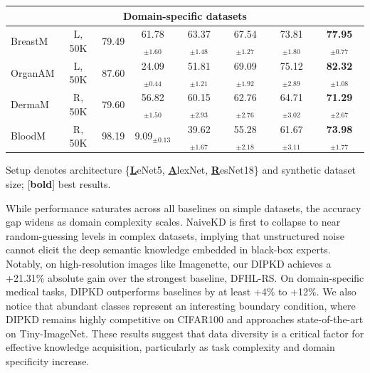 \begin{table}[ht]
\begin{threeparttable}
\begin{tabular}{l c c c c c c c}
      \multicolumn{8}{c}{\textbf{Domain-specific datasets}} \\
      \midrule
      BreastM  & L, 50K  & 79.49 & 61.78$_{\pm 1.60}$           & 63.37$_{\pm 1.48}$           & 67.54$_{\pm 1.27}$ & 73.81$_{\pm 1.80}$          & \textbf{77.95}$_{\pm 0.77}$ \\
      OrganAM  & L, 50K  & 87.60 & 24.09$_{\pm 0.44}$           & 51.81$_{\pm 1.21}$           & 69.09$_{\pm 1.92}$ & 75.12$_{\pm 2.89}$          & \textbf{82.32}$_{\pm 1.08}$ \\
      DermaM   & R, 50K  & 79.60 & 56.82$_{\pm 1.50}$           & 60.15$_{\pm 2.93}$           & 62.76$_{\pm 2.76}$ & 64.71$_{\pm 3.02}$          & \textbf{71.29}$_{\pm 2.67}$ \\
      BloodM   & R, 50K  & 98.19 & \phantom{0}9.09$_{\pm 0.13}$ & 39.62$_{\pm 1.67}$           & 55.28$_{\pm 2.18}$ & 61.67$_{\pm 3.11}$          & \textbf{73.98}$_{\pm 1.77}$ \\
      \bottomrule
    \end{tabular}
    \begin{tablenotes}[flushleft] \footnotesize
    \item {Setup denotes architecture \{\textbf{\underline{L}}eNet5, \textbf{\underline{A}}lexNet, \textbf{\underline{R}}esNet18\} and synthetic dataset size; [\textbf{bold}] best results.}
    \end{tablenotes}
  \end{threeparttable}
\end{table}

\begin{foldable}
  While performance saturates across all baselines on simple datasets, the accuracy gap widens as domain complexity scales.
  NaiveKD is first to collapse to near random-guessing levels in complex datasets, implying that unstructured noise cannot elicit the deep semantic knowledge embedded in black-box experts.
  Notably, on high-resolution images like Imagenette, our \ac{DIPKD} achieves a +21.31\% absolute gain over the strongest baseline, DFHL-RS.
  On domain-specific medical tasks, \ac{DIPKD} outperforms baselines by at least +4\% to +12\%.
  We also notice that abundant classes represent an interesting boundary condition, where \ac{DIPKD} remains highly competitive on CIFAR100 and approaches state-of-the-art on Tiny-ImageNet.
  These results suggest that data diversity is a critical factor for effective knowledge acquisition, particularly as task complexity and domain specificity increase.
\end{foldable}


